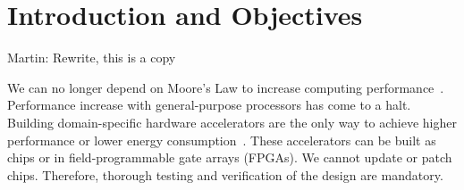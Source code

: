 \documentclass[fleqn,12pt]{article}
\newcommand{\martin}[1]{{\color{blue} Martin: #1}}
\begin{document}
%
%
%
%
%



\section{Introduction and Objectives}
\label{sec:objectives}

\martin{Rewrite, this is a copy}

We can no longer depend on Moore's Law to increase computing performance~\cite{dark-silicon:2011}.
Performance increase with general-purpose processors has come to a halt.
Building domain-specific hardware accelerators are the only way to achieve
higher performance or lower energy consumption~\cite{domain-hw-acc:2020}.
These accelerators can be built as chips or in field-programmable gate arrays (FPGAs).
We cannot update or patch chips. Therefore, thorough testing and verification of the design are mandatory.
\end{document}
